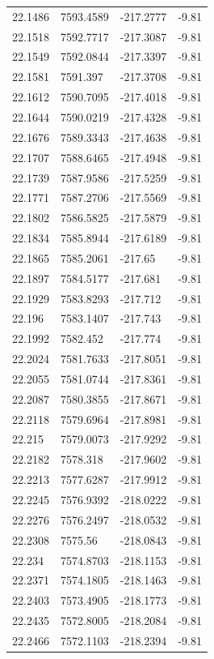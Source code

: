 \begin{table}[H]
\begin{tabular}{llll}
22.1486 & 7593.4589 & -217.2777 & -9.81 \\
22.1518 & 7592.7717 & -217.3087 & -9.81 \\
22.1549 & 7592.0844 & -217.3397 & -9.81 \\
22.1581 & 7591.397 & -217.3708 & -9.81 \\
22.1612 & 7590.7095 & -217.4018 & -9.81 \\
22.1644 & 7590.0219 & -217.4328 & -9.81 \\
22.1676 & 7589.3343 & -217.4638 & -9.81 \\
22.1707 & 7588.6465 & -217.4948 & -9.81 \\
22.1739 & 7587.9586 & -217.5259 & -9.81 \\
22.1771 & 7587.2706 & -217.5569 & -9.81 \\
22.1802 & 7586.5825 & -217.5879 & -9.81 \\
22.1834 & 7585.8944 & -217.6189 & -9.81 \\
22.1865 & 7585.2061 & -217.65 & -9.81 \\
22.1897 & 7584.5177 & -217.681 & -9.81 \\
22.1929 & 7583.8293 & -217.712 & -9.81 \\
22.196 & 7583.1407 & -217.743 & -9.81 \\
22.1992 & 7582.452 & -217.774 & -9.81 \\
22.2024 & 7581.7633 & -217.8051 & -9.81 \\
22.2055 & 7581.0744 & -217.8361 & -9.81 \\
22.2087 & 7580.3855 & -217.8671 & -9.81 \\
22.2118 & 7579.6964 & -217.8981 & -9.81 \\
22.215 & 7579.0073 & -217.9292 & -9.81 \\
22.2182 & 7578.318 & -217.9602 & -9.81 \\
22.2213 & 7577.6287 & -217.9912 & -9.81 \\
22.2245 & 7576.9392 & -218.0222 & -9.81 \\
22.2276 & 7576.2497 & -218.0532 & -9.81 \\
22.2308 & 7575.56 & -218.0843 & -9.81 \\
22.234 & 7574.8703 & -218.1153 & -9.81 \\
22.2371 & 7574.1805 & -218.1463 & -9.81 \\
22.2403 & 7573.4905 & -218.1773 & -9.81 \\
22.2435 & 7572.8005 & -218.2084 & -9.81 \\
22.2466 & 7572.1103 & -218.2394 & -9.81 \\

\end{tabular}
\end{table}
